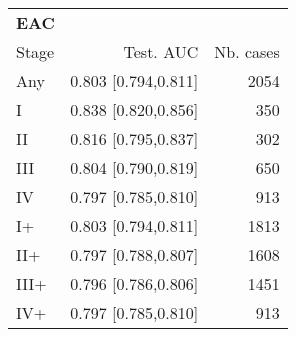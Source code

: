 \begin{table}[ht]
\centering
\begin{tabular}{lrr}
  \toprule
  \multicolumn{3}{l}{\textbf{EAC}}\\
Stage & Test. AUC & Nb. cases \\ 
  \midrule
Any & 0.803 [0.794,0.811] & 2054 \\ 
   \addlinespace
I & 0.838 [0.820,0.856] & 350 \\ 
  II & 0.816 [0.795,0.837] & 302 \\ 
  III & 0.804 [0.790,0.819] & 650 \\ 
  IV & 0.797 [0.785,0.810] & 913 \\ 
   \addlinespace
I+ & 0.803 [0.794,0.811] & 1813 \\ 
  II+ & 0.797 [0.788,0.807] & 1608 \\ 
  III+ & 0.796 [0.786,0.806] & 1451 \\ 
  IV+ & 0.797 [0.785,0.810] & 913 \\ 
   \bottomrule
\end{tabular}
\end{table}